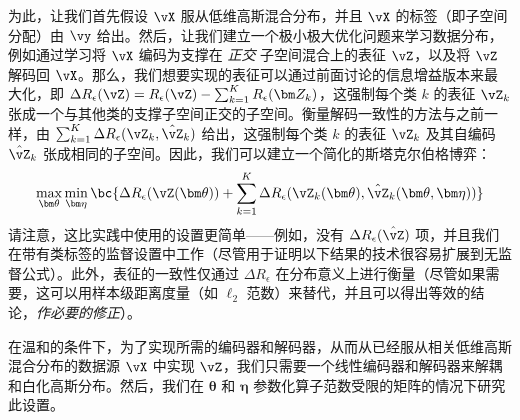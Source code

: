 \documentclass[../../book-main_zh.tex]{subfiles}
\begin{document}
为此，让我们首先假设 \(\vX\) 服从低维高斯混合分布，并且 \(\vX\) 的标签（即子空间分配）由 \(\vy\) 给出。然后，让我们建立一个极小极大优化问题来学习数据分布，例如通过学习将 \(\vX\) 编码为支撑在 \textit{正交} 子空间混合上的表征 \(\vZ\)，以及将 \(\vZ\) 解码回 \(\vX\)。那么，我们想要实现的表征可以通过前面讨论的信息增益版本来最大化，即 \( \Delta R_{\epsilon}(\vZ) = R_{\epsilon}(\vZ) - \sum_{k=1}^K R_{\epsilon}(\bm Z_k) \)，这强制每个类 \(k\) 的表征 \(\vZ_{k}\) 张成一个与其他类的支撑子空间正交的子空间。衡量解码一致性的方法与之前一样，由 \(\sum_{k = 1}^{K}\Delta R_\epsilon(\vZ_{k}, \hat{\vZ}_{k})\) 给出，这强制每个类 \(k\) 的表征 \(\vZ_{k}\) 及其自编码 \(\hat{\vZ}_{k}\) 张成相同的子空间。因此，我们可以建立一个简化的斯塔克尔伯格博弈：
\begin{equation}\label{eq:ctrl_msp_game}
    \max_{\bm \theta}\min_{\bm \eta}\bc{\Delta R_\epsilon(\vZ(\bm
        \theta)) + \sum_{k = 1}^{K}\Delta R_\epsilon(\vZ_{k}(\bm \theta),
    \hat{\vZ}_{k}(\bm \theta, \bm \eta))}
\end{equation}
请注意，这比实践中使用的设置更简单——例如，没有 \(\Delta R_\epsilon(\hat{\vZ})\) 项，并且我们在带有类标签的监督设置中工作（尽管用于证明以下结果的技术很容易扩展到无监督公式）。此外，表征的一致性仅通过 \(\Delta R_\epsilon\) 在分布意义上进行衡量（尽管如果需要，这可以用样本级距离度量（如 \(\ell_{2}\) 范数）来替代，并且可以得出等效的结论，\textit{作必要的修正}）。

在温和的条件下，为了实现所需的编码器和解码器，从而从已经服从相关低维高斯混合分布的数据源 \(\vX\) 中实现 \(\vZ\)，我们只需要一个线性编码器和解码器来解耦和白化高斯分布。然后，我们在 \(\bm \theta\) 和 \(\bm \eta\) 参数化算子范数受限的矩阵的情况下研究此设置。
\end{document}
